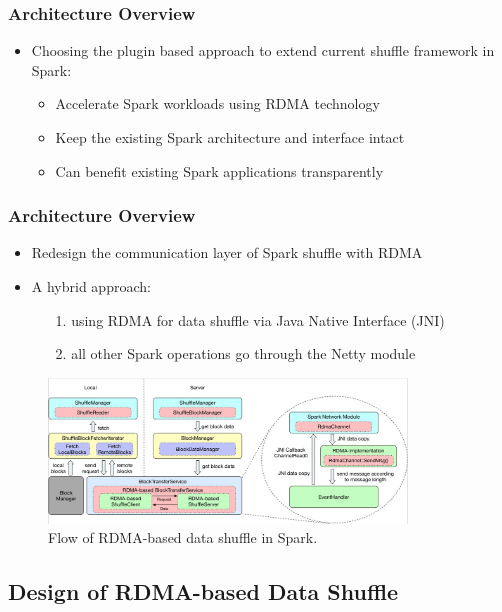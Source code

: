 \documentclass{beamer}
\begin{document}
\begin{frame}
  \frametitle{Architecture Overview}
  \begin{itemize}
  \item Choosing the plugin based approach to extend current shuffle framework
    in Spark:
    \begin{itemize}
    \item Accelerate Spark workloads using RDMA technology
    \item Keep the existing Spark architecture and interface intact
    \item Can benefit existing Spark applications transparently
    \end{itemize}
  \end{itemize}
\end{frame}

\begin{frame}
  \frametitle{Architecture Overview}
  \begin{itemize}
  \item Redesign the communication layer of Spark shuffle with RDMA
  \item A hybrid approach:
    \begin{itemize}
    \item [1.] using RDMA for data shuffle via Java Native Interface (JNI)
    \item [2.] all other Spark operations go through the Netty module
    \end{itemize}
  \end{itemize}
  \begin{figure}[!b]
    \centering
    \includegraphics[width=0.85\textwidth]{shuffle-data-flow.png}
    \caption{Flow of RDMA-based data shuffle in Spark.}
    \label{fig:shuffle-data-flow}
  \end{figure}
\end{frame}

\subsection{Design of RDMA-based Data Shuffle}
\end{document}
